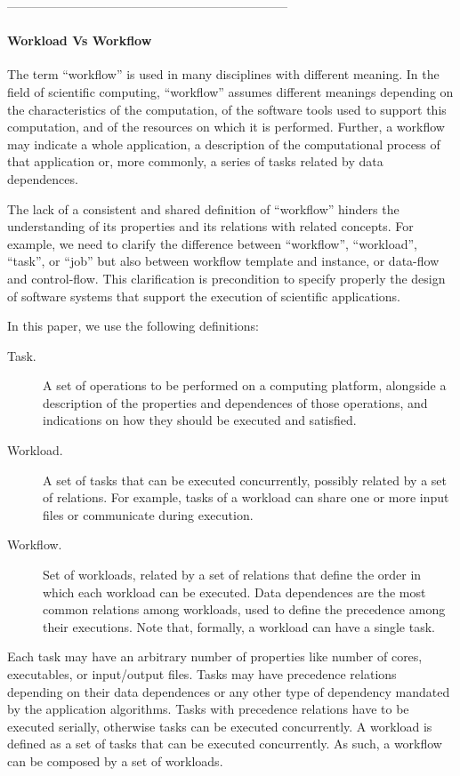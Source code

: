 \documentclass[10pt, conference, compsocconf]{IEEEtran}
\begin{document}
--------------------------------------------------------------------

\paragraph*{Workload Vs Workflow} The term ``workflow'' is used in many
disciplines with different meaning. In the field of scientific computing,
``workflow'' assumes different meanings depending on the characteristics of
the computation, of the software tools used to support this computation, and
of the resources on which it is performed. Further, a workflow may indicate a
whole application, a description of the computational process of that
application or, more commonly, a series of tasks related by data
dependences.

The lack of a consistent and shared definition of ``workflow'' hinders the
understanding of its properties and its relations with related concepts. For
example, we need to clarify the difference between ``workflow'', ``workload'',
``task'', or ``job'' but also between workflow template and instance, or
data-flow and control-flow. This clarification is precondition to specify
properly the design of software systems that support the execution of
scientific applications.

In this paper, we use the following definitions:

\begin{description}
  \item[Task.] A set of operations to be performed on a computing platform,
  alongside a description of the properties and dependences of those
  operations, and indications on how they should be executed and satisfied.
  \item[Workload.] A set of tasks that can be executed concurrently, possibly
  related by a set of relations. For example, tasks of a workload can share
  one or more input files or communicate during execution.
  \item[Workflow.] Set of workloads, related by a set of relations that define
  the order in which each workload can be executed. Data dependences are the
  most common relations among workloads, used to define the precedence among
  their executions. Note that, formally, a workload can have a single task.
\end{description}

Each task may have an arbitrary number of properties like number of cores,
executables, or input/output files. Tasks may have precedence relations
depending on their data dependences or any other type of dependency mandated
by the application algorithms. Tasks with precedence relations have to be
executed serially, otherwise tasks can be executed concurrently. A workload is
defined as a set of tasks that can be executed concurrently. As such, a
workflow can be composed by a set of workloads.
\end{document}
